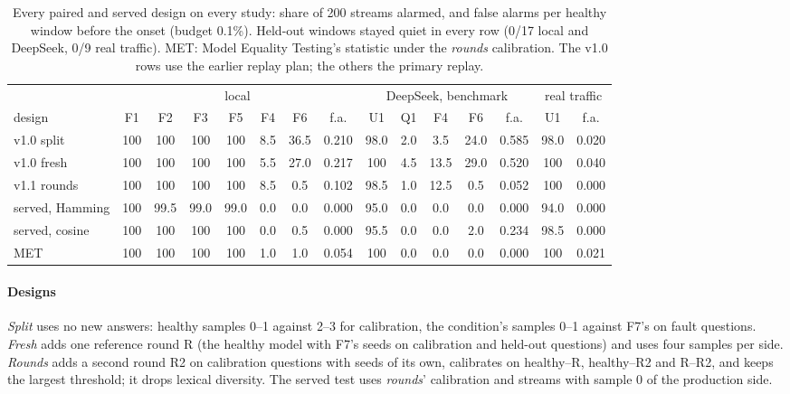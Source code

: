 \documentclass{article}
\begin{document}
\begin{table}[t]
  \centering\small
  \caption{Every paired and served design on every study: share of 200 streams
  alarmed, and false alarms per healthy window before the onset (budget 0.1\%).
  Held-out windows stayed quiet in every row (0/17 local and DeepSeek, 0/9 real
  traffic). MET: Model Equality Testing's statistic under the \emph{rounds}
  calibration. The v1.0 rows use the earlier replay plan; the others the primary
  replay.}
  \label{tab:paired}
  \setlength{\tabcolsep}{3.4pt}
  \begin{tabular}{l|cccccc|c|cccc|c|c|c}
    \toprule
    & \multicolumn{7}{c|}{local} & \multicolumn{5}{c|}{DeepSeek, benchmark} & \multicolumn{2}{c}{real traffic} \\
    design & F1 & F2 & F3 & F5 & F4 & F6 & f.a. & U1 & Q1 & F4 & F6 & f.a. & U1 & f.a. \\
    \midrule
    v1.0 split & 100 & 100 & 100 & 100 & 8.5 & 36.5 & 0.210 & 98.0 & 2.0 & 3.5 & 24.0 & 0.585 & 98.0 & 0.020 \\
    v1.0 fresh & 100 & 100 & 100 & 100 & 5.5 & 27.0 & 0.217 & 100 & 4.5 & 13.5 & 29.0 & 0.520 & 100 & 0.040 \\
    v1.1 rounds & 100 & 100 & 100 & 100 & 8.5 & 0.5 & 0.102 & 98.5 & 1.0 & 12.5 & 0.5 & 0.052 & 100 & 0.000 \\
    served, Hamming & 100 & 99.5 & 99.0 & 99.0 & 0.0 & 0.0 & 0.000 & 95.0 & 0.0 & 0.0 & 0.0 & 0.000 & 94.0 & 0.000 \\
    served, cosine & 100 & 100 & 100 & 100 & 0.0 & 0.5 & 0.000 & 95.5 & 0.0 & 0.0 & 2.0 & 0.234 & 98.5 & 0.000 \\
    MET & 100 & 100 & 100 & 100 & 1.0 & 1.0 & 0.054 & 100 & 0.0 & 0.0 & 0.0 & 0.000 & 100 & 0.021 \\
    \bottomrule
  \end{tabular}
\end{table}

\paragraph{Designs} \emph{Split} uses no new answers: healthy samples 0--1 against
2--3 for calibration, the condition's samples 0--1 against F7's on fault
questions. \emph{Fresh} adds one reference round R (the healthy model with F7's
seeds on calibration and held-out questions) and uses four samples per side.
\emph{Rounds} adds a second round R2 on calibration questions with seeds of its
own, calibrates on healthy--R, healthy--R2 and R--R2, and keeps the largest
threshold; it drops lexical diversity. The served test uses \emph{rounds}'
calibration and streams with sample 0 of the production side.
\end{document}
